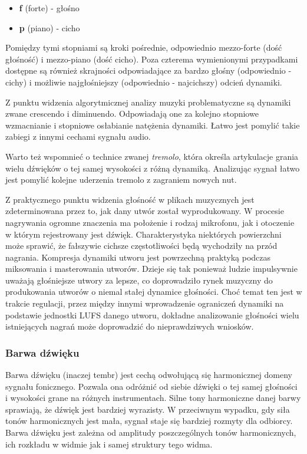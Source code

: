 \documentclass[12pt,a4paper,twoside]{mwart}
\begin{document}
\begin{itemize}
  \item \textbf{f} (forte) - głośno
  \item \textbf{p} (piano) - cicho
\end{itemize}

Pomiędzy tymi stopniami są kroki pośrednie, odpowiednio mezzo-forte (dość głośność) i mezzo-piano (dość cicho). Poza czterema wymienionymi przypadkami dostępne są również skrajności odpowiadające za bardzo głośny (odpowiednio - cichy) i możliwie najgłośniejszy (odpowiednio - najcichszy) odcień dynamiki. 

Z punktu widzenia algorytmicznej analizy muzyki problematyczne są dynamiki zwane crescendo i diminuendo. Odpowiadają one za kolejno stopniowe wzmacnianie i stopniowe osłabianie natężenia dynamiki. Łatwo jest pomylić takie zabiegi z innymi cechami sygnału audio.

Warto też wspomnieć o technice zwanej \textit{tremolo}, która określa artykulacje  grania wielu dźwięków o tej samej wysokości z różną dynamiką. Analizując sygnał łatwo jest pomylić kolejne uderzenia tremolo z zagraniem nowych nut.

Z praktycznego punktu widzenia głośność w plikach muzycznych jest zdeterminowana przez to, jak dany utwór został wyprodukowany. W procesie nagrywania ogromne znaczenia ma położenie i rodzaj mikrofonu, jak i otoczenie w którym rejestrowany jest dźwięk. Charakterystyka niektórych powierzchni może sprawić, że fałszywie cichsze częstotliwości będą wychodziły na przód nagrania. Kompresja dynamiki utworu jest powrzechną praktyką podczas miksowania i masterowania utworów. Dzieje się tak ponieważ ludzie impulsywnie uważają głośniejsze utwory za lepsze, co doprowadziło rynek muzyczny do produkowania utworów o niemal stałej dynamice głośności. Choć temat ten jest w trakcie regulacji, przez między innymi wprowadzenie ograniczeń dynamiki na podstawie jednostki LUFS danego utworu, dokładne analizowanie głośności wielu istniejących nagrań może doprowadzić do nieprawdziwych wniosków.

\subsubsection{Barwa dźwięku}
Barwa dźwięku (inaczej tembr) jest cechą odwołującą się harmonicznej domeny sygnału fonicznego. Pozwala ona odróżnić od siebie dźwięki o tej samej głośności i wysokości grane na różnych instrumentach. Silne tony harmoniczne danej barwy sprawiają, że dźwięk jest bardziej wyrazisty. W przeciwnym wypadku, gdy siła tonów harmonicznych jest mała, sygnał staje się bardziej rozmyty dla odbiorcy. Barwa dźwięku jest zależna od amplitudy poszczególnych tonów harmonicznych, ich rozkładu w widmie jak i samej struktury tego widma.
\end{document}
